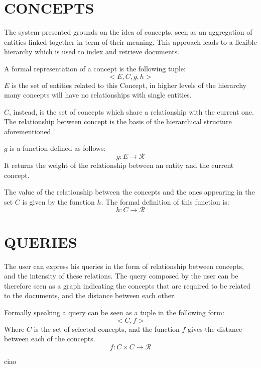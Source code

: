 \documentclass{acm_proc_article-sp-sigmod07}
\begin{document}
\section{CONCEPTS}
The system presented grounds on the idea of concepts, seen as an
aggregation of entities linked together in term of their meaning.
This approach leads to a flexible hierarchy which is used to index and
retrieve documents.

A formal representation of a concept is the following tuple:
$$
<E, C, g, h>
$$
$E$ is the set of entities related to this Concept, in higher levels of
the hierarchy many concepts will have no relationships with single
entities.

$C$, instead, is the set of concepts which share a relationship with the
current one. The relationship between concept is the basis of the
hierarchical structure aforementioned.

$g$ is a function defined as follows:
$$
g: E \rightarrow \mathcal{R}
$$
It returns the weight of the relationship between an entity and the
current concept.

The value of the relationship between the concepts and the ones appearing
in the set $C$ is given by the function $h$. The formal definition of this
function is:
$$
h: C \rightarrow \mathcal{R}
$$

\section{QUERIES}
The user can express his queries in the form of relationship between
concepts, and the intensity of these relations. 
The query composed by the user can be therefore seen as a graph indicating
the concepts that are required to be related to the documents, and the
distance between each other.

Formally speaking a query can be seen as a tuple in the following form:
$$
<C, f>
$$
Where $C$ is the set of selected concepts, and the function $f$ gives the
distance between each of the concepts.
$$
f: C \times C \rightarrow \mathcal{R}
$$

ciao





\newpage
\null
\newpage
\end{document}
